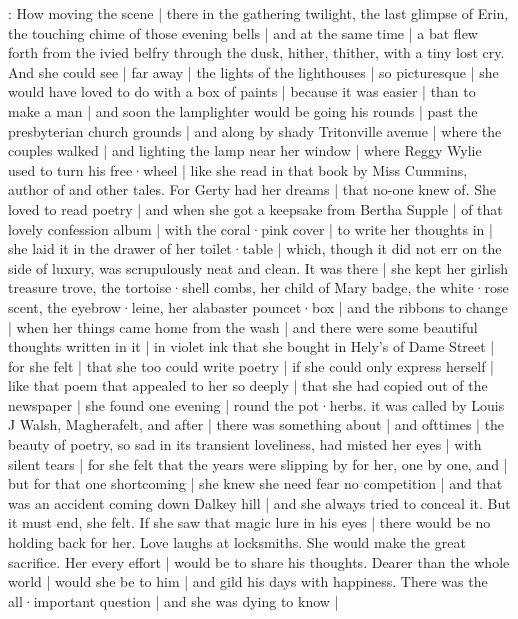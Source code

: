 :
How moving the scene |
there in the gathering twilight,
the last glimpse of Erin,
the touching chime of those evening bells |
and at the same time |
a bat
flew forth from the ivied belfry through the dusk,
hither,
thither,
with a tiny lost cry.
And she could see |
far away |
the lights of the lighthouses |
so picturesque |
she would have loved to do with a box of paints |
because it was easier |
than to make a man |
and soon the lamplighter would be going his rounds |
past the presbyterian church grounds |%
and along by shady Tritonville avenue |
where the couples walked |
and lighting the lamp near her window |
where Reggy Wylie used to turn his free·wheel |
like she read in that book
 by Miss Cummins,
author of  and other tales.
For Gerty had her dreams |
that no-one knew of.
She loved to read poetry |
and when she got a keepsake from Bertha Supple |
of that lovely confession album |
with the coral·pink cover |
to write her thoughts in |
she laid it in the drawer of her toilet·table |
which,
though it did not err on the side of luxury,
was scrupulously neat and clean.
It was there |
she kept her girlish treasure trove,
the tortoise·shell combs,
her child of Mary badge,
the white·rose scent,
the eyebrow·leine,%
her alabaster pouncet·box |
and the ribbons to change |
when her things came home from the wash |
and there were
some beautiful thoughts written in it |
in violet ink that she bought in Hely's of Dame Street |
for she felt |
that she too could write poetry |
if she could only express herself |
like that poem that appealed to her so deeply |
that she had copied out of the newspaper |
she found one evening |
round the pot·herbs.
it was called by Louis J Walsh,
Magherafelt,
and after |
there was something about
 |
and ofttimes |
the beauty of poetry,
so sad in its transient loveliness,
had misted her eyes |
with silent tears |
for she felt
that the years were slipping by for her,
one by one,
and |
but for that one shortcoming |%
she knew she need fear no competition |
and that was an accident coming down Dalkey hill |
and she always tried to conceal it.
But it must end,
she felt.
If she saw that magic lure in his eyes |
there would be no holding back for her.
Love laughs at locksmiths.
She would make the great sacrifice.
Her every effort |
would be to share his thoughts.
Dearer than the whole world |
would she be to him |
and gild his days with happiness.
There was the all·important question |
and she was dying to know |
